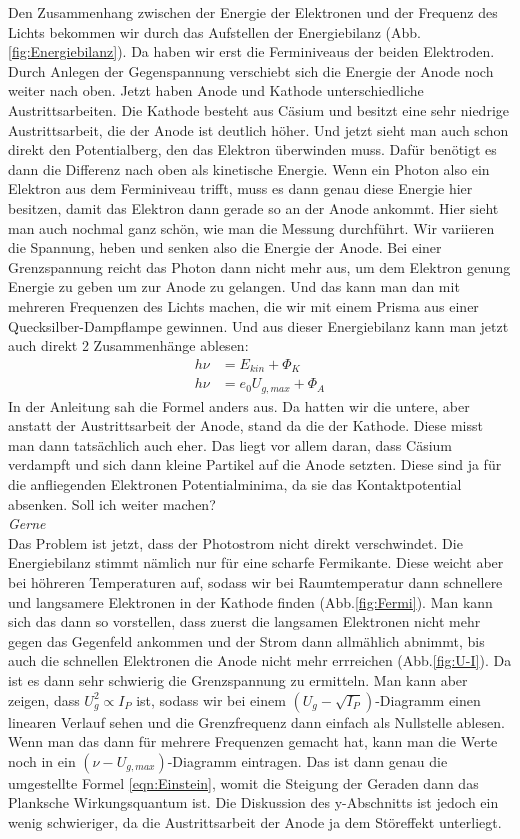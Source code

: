 Den Zusammenhang zwischen der Energie der Elektronen und der Frequenz des Lichts bekommen wir durch das Aufstellen der Energiebilanz 
(Abb.\ref{fig:Energiebilanz}). 
Da haben wir erst die Ferminiveaus der beiden Elektroden. Durch Anlegen der Gegenspannung verschiebt sich die Energie der Anode noch weiter
nach oben. Jetzt haben Anode und Kathode unterschiedliche Austrittsarbeiten. Die Kathode besteht aus Cäsium und besitzt eine sehr niedrige 
Austrittsarbeit, die der Anode ist deutlich höher. Und jetzt sieht man auch schon direkt den Potentialberg, den das Elektron überwinden muss.
Dafür benötigt es dann die Differenz nach oben als kinetische Energie. Wenn ein Photon also ein Elektron aus dem Ferminiveau trifft, muss es 
dann genau diese Energie hier besitzen, damit das Elektron dann gerade so an der Anode ankommt. Hier sieht man auch nochmal ganz schön, wie 
man die Messung durchführt. Wir variieren die Spannung, heben und senken also die Energie der Anode. Bei einer Grenzspannung reicht das 
Photon dann nicht mehr aus, um dem Elektron genung Energie zu geben um zur Anode zu gelangen. Und das kann man dan mit mehreren Frequenzen des
Lichts machen, die wir mit einem Prisma aus einer Quecksilber-Dampflampe gewinnen. Und aus dieser Energiebilanz kann man jetzt auch direkt 
2 Zusammenhänge ablesen:
\begin{align}
    h\nu&=E_{kin}+\Phi_K \\
    h\nu&=e_0U_{g,max}+\Phi_A \label{eqn:Einstein}
\end{align}
In der Anleitung sah die Formel anders aus. Da hatten wir die untere, aber anstatt der Austrittsarbeit der Anode, stand da die der Kathode. 
Diese misst man dann tatsächlich auch eher. Das liegt vor allem daran, dass Cäsium verdampft und sich dann kleine Partikel auf die Anode 
setzten. Diese sind ja für die anfliegenden Elektronen Potentialminima, da sie das Kontaktpotential absenken. 
Soll ich weiter machen? 
\\
\textit{Gerne}
\\
Das Problem ist jetzt, dass der Photostrom nicht direkt verschwindet. Die Energiebilanz stimmt nämlich nur für eine scharfe Fermikante. 
Diese weicht aber bei höhreren Temperaturen auf, sodass wir bei Raumtemperatur dann schnellere und langsamere Elektronen in der Kathode finden
(Abb.\ref{fig:Fermi}). Man kann sich das dann so vorstellen, dass zuerst die langsamen Elektronen nicht mehr gegen das Gegenfeld ankommen 
und der Strom dann allmählich abnimmt, bis auch die schnellen Elektronen die Anode nicht mehr errreichen (Abb.\ref{fig:U-I}). Da ist es dann
sehr schwierig die Grenzspannung zu ermitteln. Man kann aber zeigen, dass $U_{g}^2\propto I_{P}$ ist, sodass wir bei einem 
$(U_g-\sqrt{I_P})$-Diagramm einen linearen Verlauf sehen und die Grenzfrequenz dann einfach als Nullstelle ablesen. Wenn man das dann für 
mehrere Frequenzen gemacht hat, kann man die Werte noch in ein $(\nu-U_{g,max})$-Diagramm eintragen. Das ist dann genau die umgestellte Formel 
\ref{eqn:Einstein}, womit die Steigung der Geraden dann das Planksche Wirkungsquantum ist. Die Diskussion des y-Abschnitts ist jedoch ein 
wenig schwieriger, da die Austrittsarbeit der Anode ja dem Störeffekt unterliegt.

